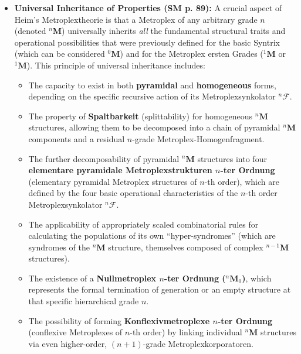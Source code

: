 \documentclass[12pt]{article}
\newcommand{\q}[1]{\enquote{#1}}
\newcommand{\metroplex}[1]{{}^{#1}\mathbf{M}}
\newcommand{\hypersyntrix}{\metroplex{1}}
\newcommand{\metroplexsynkolator}[1]{{}^{#1}\mathcal{F}}
\newcommand{\nullmetroplex}[1]{{}^{#1}\mathbf{M}_0}
\begin{document}
\begin{itemize}
    \item \textbf{Universal Inheritance of Properties (SM p. 89):}
    A crucial aspect of Heim's Metroplextheorie is that a Metroplex of any arbitrary grade \( n \) (denoted \( \metroplex{n} \)) universally inherits \textit{all} the fundamental structural traits and operational possibilities that were previously defined for the basic Syntrix (which can be considered \( \metroplex{0} \)) and for the Metroplex ersten Grades (\( \hypersyntrix \) or \( \metroplex{1} \)). This principle of universal inheritance includes:
    \begin{itemize}
        \item The capacity to exist in both \textbf{pyramidal} and \textbf{homogeneous} forms, depending on the specific recursive action of its Metroplexsynkolator \( \metroplexsynkolator{n} \).
        \item The property of \textbf{Spaltbarkeit} (splittability) for homogeneous \( \metroplex{n} \) structures, allowing them to be decomposed into a chain of pyramidal \( \metroplex{n} \) components and a residual \( n \)-grade Metroplex-Homogenfragment.
        \item The further decomposability of pyramidal \( \metroplex{n} \) structures into four \textbf{elementare pyramidale Metroplexstrukturen \( n \)-ter Ordnung} (elementary pyramidal Metroplex structures of \(n\)-th order), which are defined by the four basic operational characteristics of the \(n\)-th order Metroplexsynkolator \( \metroplexsynkolator{n} \).
        \item The applicability of appropriately scaled combinatorial rules for calculating the populations of its own \q{hyper-syndromes} (which are syndromes of the \( \metroplex{n} \) structure, themselves composed of complex \( \metroplex{n-1} \) structures).
        \item The existence of a \textbf{Nullmetroplex \( n \)-ter Ordnung (\( \nullmetroplex{n} \))}, which represents the formal termination of generation or an empty structure at that specific hierarchical grade \(n\).
        \item The possibility of forming \textbf{Konflexivmetroplexe \( n \)-ter Ordnung} (conflexive Metroplexes of \(n\)-th order) by linking individual \( \metroplex{n} \) structures via even higher-order, \( (n+1) \)-grade Metroplexkorporatoren.
    \end{itemize}


\end{itemize}
\end{document}
